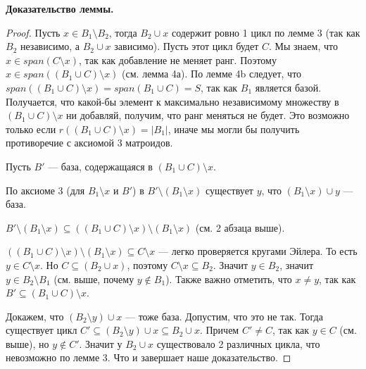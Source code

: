 \documentclass[a4paper, 12pt]{article}
\begin{document}
{\bf Доказательство леммы.}
\begin{proof}

Пусть $x \in B_1 \setminus B_2$, тогда $B_2 \cup x$ содержит ровно 1 цикл по
лемме 3 (так как $B_2$ независимо, а $B_2 \cup x$ зависимо). Пусть этот цикл
будет $C$. Мы знаем, что $x \in span(C \setminus x)$, так как добавление не 
меняет ранг. Поэтому $x \in span((B_1 \cup C) \setminus x)$ (см. лемма 4а). По 
лемме 4b следует, что
$span((B_1 \cup C) \setminus x) = span(B_1 \cup C) = S$, так как $B_1$ является 
базой. Получается, что какой-бы элемент к максимально независимому множеству 
в $(B_1 \cup C) \setminus x$ ни добавляй, получим, что ранг меняться не будет. 
Это возможно только если $r((B_1 \cup C) \setminus x) = |B_1|$, иначе мы могли
бы получить противоречие с аксиомой 3 матроидов.

Пусть $B'$ --- база, содержащаяся в $(B_1 \cup C) \setminus x$.

По аксиоме 3 (для $B_1 \setminus x$ и $B'$) в $B' \setminus (B_1 \setminus x)$ существует $y$, что 
$(B_1 \setminus x) \cup y$ --- база. 

$B' \setminus (B_1 \setminus x) \subseteq ((B_1 \cup C) \setminus x) \setminus
(B_1 \setminus x)$ (см. 2 абзаца выше).

$((B_1 \cup C) \setminus x) \setminus (B_1 \setminus x) \subseteq C \setminus x$
--- легко проверяется кругами Эйлера. То есть $y \in C \setminus x$. Но $C 
\subseteq (B_2 \cup x)$, поэтому $C \setminus x \subseteq B_2$. Значит $y \in B_2$,
значит $y \in B_2 \setminus B_1$ (см. выше, почему $y \not\in B_1$). Также важно
отметить, что $x \neq y$, так как $B' \subseteq (B_1 \cup C)\setminus x$.

Докажем, что $(B_2 \setminus y) \cup x$ --- тоже база. Допустим, что это не так.
Тогда существует цикл
$C' \subseteq (B_2 \setminus y) \cup x \subseteq B_2 \cup x$. Причем $C' \neq C$,
так как $y \in C$ (см. выше), но $y \not\in C'$. Значит у $B_2 \cup x$ существовало 2 различных цикла,
что невозможно по лемме 3. Что и завершает наше доказательство.
\end{proof}
\end{document}
